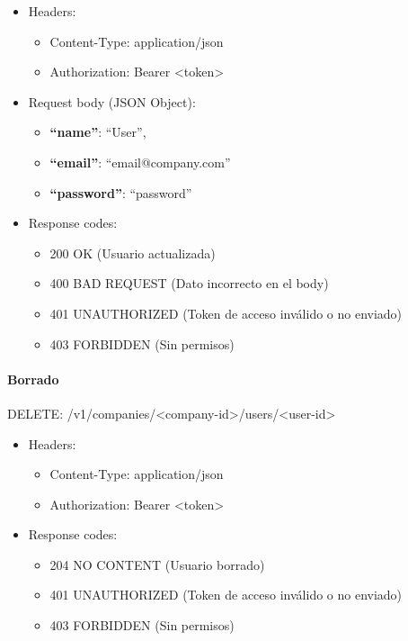 \documentclass[12pt,a4paperpaper,]{report}
\providecommand{\tightlist}{%
  \setlength{\itemsep}{0pt}\setlength{\parskip}{0pt}}
\let\oldparagraph\paragraph
\renewcommand{\paragraph}[1]{\oldparagraph{#1}\mbox{}}
\begin{document}
\begin{itemize}
\tightlist
\item
  Headers:

  \begin{itemize}
  \tightlist
  \item
    Content-Type: application/json
  \item
    Authorization: Bearer \textless{}token\textgreater{}
  \end{itemize}
\item
  Request body (JSON Object):

  \begin{itemize}
  \tightlist
  \item
    \textbf{``name''}: ``User'',
  \item
    \textbf{``email''}: ``email@company.com''
  \item
    \textbf{``password''}: ``password''
  \end{itemize}
\item
  Response codes:

  \begin{itemize}
  \tightlist
  \item
    200 OK (Usuario actualizada)
  \item
    400 BAD REQUEST (Dato incorrecto en el body)
  \item
    401 UNAUTHORIZED (Token de acceso inválido o no enviado)
  \item
    403 FORBIDDEN (Sin permisos)
  \end{itemize}
\end{itemize}

\paragraph{Borrado}\label{borrado-1}

DELETE:
/v1/companies/\textless{}company-id\textgreater{}/users/\textless{}user-id\textgreater{}

\begin{itemize}
\tightlist
\item
  Headers:

  \begin{itemize}
  \tightlist
  \item
    Content-Type: application/json
  \item
    Authorization: Bearer \textless{}token\textgreater{}
  \end{itemize}
\item
  Response codes:

  \begin{itemize}
  \tightlist
  \item
    204 NO CONTENT (Usuario borrado)
  \item
    401 UNAUTHORIZED (Token de acceso inválido o no enviado)
  \item
    403 FORBIDDEN (Sin permisos)
  \end{itemize}
\end{itemize}
\end{document}
